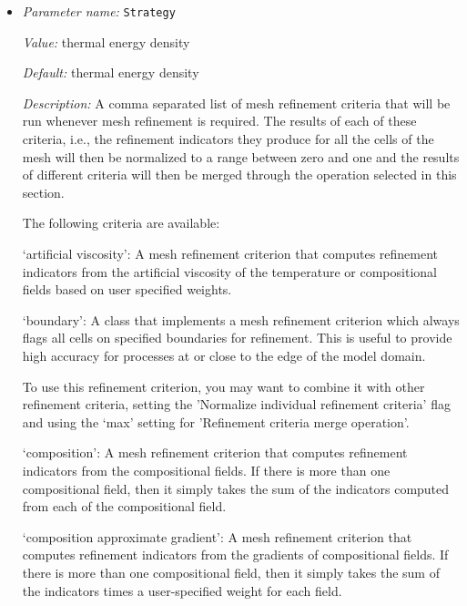\begin{itemize}
{\it Value:} false


{\it Default:} false


{\it Description:} Whether or not the postprocessors should be executed after each of the initial adaptive refinement cycles that are run at the start of the simulation.


{\it Possible values:} A boolean value (true or false)
\item {\it Parameter name:} {\tt Strategy}
\label{parameters:Mesh refinement/Strategy}


{\it Value:} thermal energy density


{\it Default:} thermal energy density


{\it Description:} A comma separated list of mesh refinement criteria that will be run whenever mesh refinement is required. The results of each of these criteria, i.e., the refinement indicators they produce for all the cells of the mesh will then be normalized to a range between zero and one and the results of different criteria will then be merged through the operation selected in this section.

The following criteria are available:

`artificial viscosity': A mesh refinement criterion that computes refinement indicators from the artificial viscosity of the temperature or compositional fields based on user specified weights.

`boundary': A class that implements a mesh refinement criterion which always flags all cells on specified boundaries for refinement. This is useful to provide high accuracy for processes at or close to the edge of the model domain.

To use this refinement criterion, you may want to combine it with other refinement criteria, setting the 'Normalize individual refinement criteria' flag and using the `max' setting for 'Refinement criteria merge operation'.

`composition': A mesh refinement criterion that computes refinement indicators from the compositional fields. If there is more than one compositional field, then it simply takes the sum of the indicators computed from each of the compositional field.

`composition approximate gradient': A mesh refinement criterion that computes refinement indicators from the gradients of compositional fields. If there is more than one compositional field, then it simply takes the sum of the indicators times a user-specified weight for each field.


\end{itemize}
